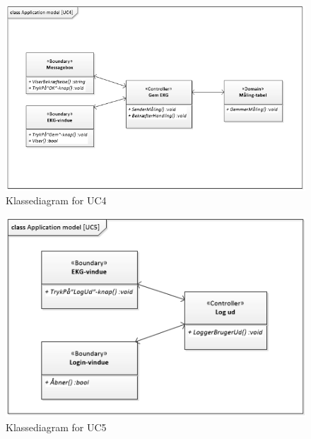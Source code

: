\begin{figure}[H]
	\centering
	\includegraphics[width=1\textwidth]{Figurer/Snip20150429_26}
	\caption{Klassediagram for UC4}
\end{figure}

\begin{figure}[H]
	\centering
	\includegraphics[width=1\textwidth]{Figurer/Snip20150429_25}
	\caption{Klassediagram for UC5}
\end{figure}





